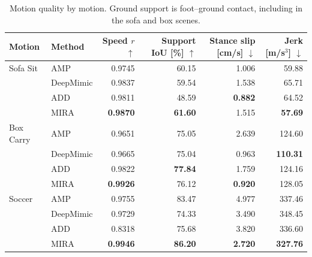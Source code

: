 \begin{table}[!ht]
\caption{Motion quality by motion. Ground support is
foot--ground contact, including in the sofa and box scenes.}
\label{tab:per_motion_quality}
\centering\small
\begin{tabular*}{\linewidth}{@{\extracolsep{\fill}}llrrrr@{}}\toprule
Motion & Method & Speed $r$ $\uparrow$ & Support IoU [\%] $\uparrow$ & Stance slip [cm/s] $\downarrow$ & Jerk [m/s$^3$] $\downarrow$ \\
\midrule
Sofa Sit & AMP & 0.9745 & 60.15 & 1.006 & 59.88 \\
 & DeepMimic & 0.9837 & 59.54 & 1.538 & 65.71 \\
 & ADD & 0.9811 & 48.59 & \textbf{0.882} & 64.52 \\
 & MIRA & \textbf{0.9870} & \textbf{61.60} & 1.515 & \textbf{57.69} \\
\midrule
Box Carry & AMP & 0.9651 & 75.05 & 2.639 & 124.60 \\
 & DeepMimic & 0.9665 & 75.04 & 0.963 & \textbf{110.31} \\
 & ADD & 0.9822 & \textbf{77.84} & 1.759 & 124.16 \\
 & MIRA & \textbf{0.9926} & 76.12 & \textbf{0.920} & 128.05 \\
\midrule
Soccer & AMP & 0.9755 & 83.47 & 4.977 & 337.46 \\
 & DeepMimic & 0.9729 & 74.33 & 3.490 & 348.45 \\
 & ADD & 0.8318 & 75.68 & 3.820 & 336.60 \\
 & MIRA & \textbf{0.9946} & \textbf{86.20} & \textbf{2.720} & \textbf{327.76} \\
\bottomrule\end{tabular*}
\end{table}
